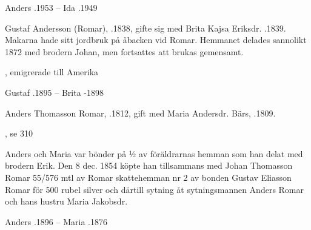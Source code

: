 Anders .1953  --  Ida .1949




Gustaf Andersson (Romar), .1838, gifte sig med Brita Kajsa Eriksdr. .1839. Makarna hade sitt jordbruk på åbacken vid Romar. Hemmanet delades sannolikt 1872 med brodern Johan, men fortsattes att brukas gemensamt.
\begin{jhchildren}
  \item {}, emigrerade till Amerika
  \item {}
  \item {}
\end{jhchildren}

Gustaf .1895  --  Brita -1898


Anders  Thomasson Romar, .1812, gift med Maria Andersdr. Bärs, .1809.
\begin{jhchildren}
  \item {}, se 310
  \item {}
  \item {}
  \item {}
  \item {}
  \item {}
  \item {}
\end{jhchildren}

Anders och Maria var bönder på ½  av föräldrarnas hemman som han delat med brodern Erik. Den 8 dec. 1854 köpte han tillsammans med Johan Thomasson Romar 55/576 mtl av Romar skattehemman nr 2 av bonden Gustav Eliasson Romar för 500 rubel silver och därtill sytning åt sytningsmannen Anders Romar och hans hustru Maria Jakobsdr.

Anders .1896  --  Maria  .1876





